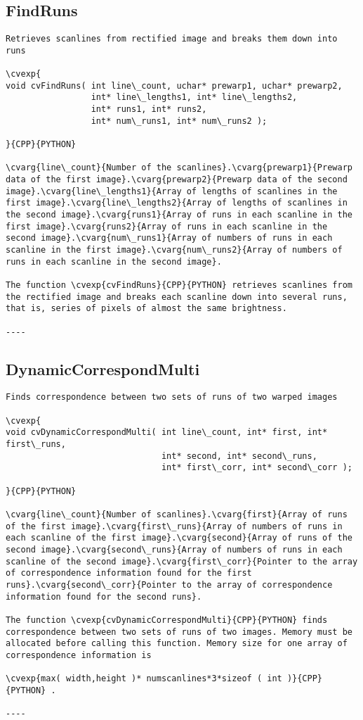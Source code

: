 \subsection{FindRuns}
\begin{verbatim}
Retrieves scanlines from rectified image and breaks them down into runs

\cvexp{
void cvFindRuns( int line\_count, uchar* prewarp1, uchar* prewarp2,
                 int* line\_lengths1, int* line\_lengths2,
                 int* runs1, int* runs2,
                 int* num\_runs1, int* num\_runs2 );

}{CPP}{PYTHON}

\cvarg{line\_count}{Number of the scanlines}.\cvarg{prewarp1}{Prewarp data of the first image}.\cvarg{prewarp2}{Prewarp data of the second image}.\cvarg{line\_lengths1}{Array of lengths of scanlines in the first image}.\cvarg{line\_lengths2}{Array of lengths of scanlines in the second image}.\cvarg{runs1}{Array of runs in each scanline in the first image}.\cvarg{runs2}{Array of runs in each scanline in the second image}.\cvarg{num\_runs1}{Array of numbers of runs in each scanline in the first image}.\cvarg{num\_runs2}{Array of numbers of runs in each scanline in the second image}.

The function \cvexp{cvFindRuns}{CPP}{PYTHON} retrieves scanlines from the rectified image and breaks each scanline down into several runs, that is, series of pixels of almost the same brightness.

----
\end{verbatim}
\subsection{DynamicCorrespondMulti}
\begin{verbatim}
Finds correspondence between two sets of runs of two warped images

\cvexp{
void cvDynamicCorrespondMulti( int line\_count, int* first, int* first\_runs,
                               int* second, int* second\_runs,
                               int* first\_corr, int* second\_corr );

}{CPP}{PYTHON}

\cvarg{line\_count}{Number of scanlines}.\cvarg{first}{Array of runs of the first image}.\cvarg{first\_runs}{Array of numbers of runs in each scanline of the first image}.\cvarg{second}{Array of runs of the second image}.\cvarg{second\_runs}{Array of numbers of runs in each scanline of the second image}.\cvarg{first\_corr}{Pointer to the array of correspondence information found for the first runs}.\cvarg{second\_corr}{Pointer to the array of correspondence information found for the second runs}.

The function \cvexp{cvDynamicCorrespondMulti}{CPP}{PYTHON} finds correspondence between two sets of runs of two images. Memory must be allocated before calling this function. Memory size for one array of correspondence information is

\cvexp{max( width,height )* numscanlines*3*sizeof ( int )}{CPP}{PYTHON} .

----
\end{verbatim}
